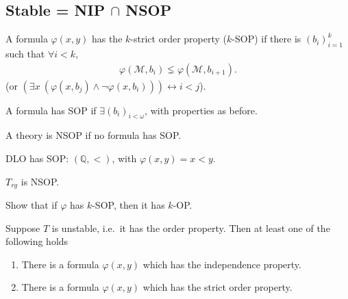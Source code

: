 \documentclass{article}
\begin{document}
\subsection{Stable = NIP \texorpdfstring{$\cap$}{intersect} NSOP}
\begin{defi}
  A formula $\varphi(x,y)$ has the $k$-strict order property ($k$-SOP) if there is $(b_i)_{i=1}^k$ such that $\forall i < k$,
  \begin{align*}
    \varphi(\mathcal{M},b_i) \lneq \varphi(\mathcal{M},b_{i+1}).
  \end{align*}
  (or $(\exists x\ (\varphi(x,b_j) \land \neg \varphi(x,b_i))) \leftrightarrow i < j$).

  A formula has SOP if $\exists (b_i)_{i < \omega}$, with properties as before.

  A theory is NSOP if no formula has SOP.
\end{defi}
\begin{eg}
  DLO has SOP: $(\mathbb{Q},<)$, with $\varphi(x,y) = x<y$.
\end{eg}
\begin{ex}
  $T_{rg}$ is NSOP.
\end{ex}
\begin{ex}
  Show that if $\varphi$ has $k$-SOP, then it has $k$-OP.
\end{ex}
\begin{thm}[Shelah]
  Suppose $T$ is unstable, i.e.\ it has the order property. Then at least one of the following holds
  \begin{enumerate}
    \item There is a formula $\varphi(x,y)$ which has the independence property.
    \item There is a formula $\varphi(x,y)$ which has the strict order property.
  \end{enumerate}
\end{thm}
\end{document}
